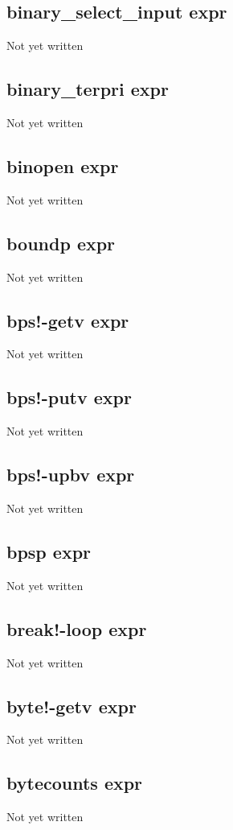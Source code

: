 \documentclass[a4paper,11pt]{article}
\begin{document}
{\subsection{\ttfamily binary\_select\_input expr}
   Not yet written

\subsection{\ttfamily binary\_terpri expr}
   Not yet written

\subsection{\ttfamily binopen expr}
   Not yet written

\subsection{\ttfamily boundp expr}
   Not yet written

\subsection{\ttfamily bps!-getv expr}
   Not yet written

\subsection{\ttfamily bps!-putv expr}
   Not yet written

\subsection{\ttfamily bps!-upbv expr}
   Not yet written

\subsection{\ttfamily bpsp expr}
   Not yet written

\subsection{\ttfamily break!-loop expr}
   Not yet written

\subsection{\ttfamily byte!-getv expr}
   Not yet written

\subsection{\ttfamily bytecounts expr}
   Not yet written

}
\end{document}
